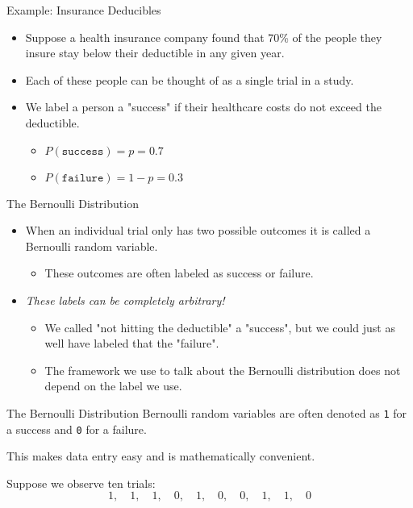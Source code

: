 \begin{frame}{Example: Insurance Deducibles}
    \begin{itemize}
        \item Suppose a health insurance company found that 70\% of the people they insure stay below their deductible in any given year.
        \item Each of these people can be thought of as a single trial in a study.
        \item We label a person a "success" if their healthcare costs do not exceed the deductible.
        \begin{itemize}
            \item $P(\texttt{success})=p=0.7$
            \item $P(\texttt{failure})=1-p=0.3$
        \end{itemize}
    \end{itemize}
\end{frame}

\begin{frame}{The Bernoulli Distribution}
    \begin{itemize}
        \item When an individual trial only has two possible outcomes it is called a Bernoulli random variable.
        \begin{itemize}
            \item These outcomes are often labeled as success or failure.
        \end{itemize}
        \item \textit{These labels can be completely arbitrary!}
        \begin{itemize}
            \item We called "not hitting the deductible" a "success", but we could just as well have labeled that the "failure".
            \item The framework we use to talk about the Bernoulli distribution does not depend on the label we use.
        \end{itemize}
    \end{itemize}
\end{frame}

\begin{frame}{The Bernoulli Distribution}
    Bernoulli random variables are often denoted as \texttt{1} for a success and \texttt{0} for a failure. 
    
    \vspace{12pt}This makes data entry easy and is mathematically convenient. 
    
    \vspace{12pt}Suppose we observe ten trials:
    \[
        1, \quad 1, \quad 1, \quad 0, \quad 1, \quad 0, \quad 0, \quad 1, \quad 1, \quad 0
    \]
\end{frame}

